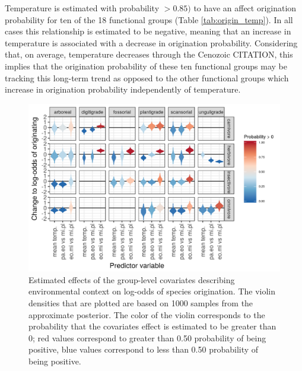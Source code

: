 \documentclass[12pt,letterpaper]{article}
\begin{document}
Temperature is estimated with probability \(> 0.85)\) to have an affect origination probability for ten of the 18 functional groups (Table \ref{tab:origin_temp}). In all cases this relationship is estimated to be negative, meaning that an increase in temperature is associated with a decrease in origination probability. Considering that, on average, temperature decreases through the Cenozoic CITATION, this implies that the origination probability of these ten functional groups may be tracking this long-term trend as opposed to the other functional groups which increase in origination probability independently of temperature.
\begin{figure}[ht]
  \centering
  \includegraphics[width=\textwidth,height=0.4\textheight,keepaspectratio=true]{figure/group_on_origin_bd}
  \caption{Estimated effects of the group-level covariates describing environmental context on log-odds of species origination. The violin densities that are plotted are based on 1000 samples from the approximate posterior. The color of the violin corresponds to the probability that the covariates effect is estimated to be greater than 0; red values correspond to greater than 0.50 probability of being positive, blue values correspond to less than 0.50 probability of being positive.} 
  \label{fig:group_origin_bd}
\end{figure}
\end{document}
